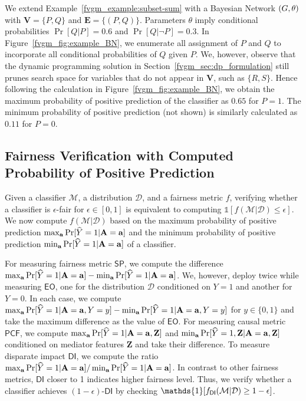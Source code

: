  	 
	\begin{example}
		\normalfont
		We extend Example~\ref{fvgm_example:subset-sum} with a Bayesian Network $ (G, \theta) $ with $ \mathbf{V} = \{P, Q\} $ and $ \mathbf{E} = \{(P,Q)\} $. Parameters $ \theta $ imply conditional probabilities $ \Pr[Q|P] = 0.6 $ and $ \Pr[Q|\neg P] = 0.3 $. 	In Figure~\ref{fvgm_fig:example_BN}, we enumerate all  assignment of $ P $ and $ Q $ to  incorporate all conditional probabilities of $ Q $ given $ P $. We, however, observe that the dynamic programming solution in Section~\ref{fvgm_sec:dp_formulation} still prunes search space for variables that do not appear in $ \mathbf{V} $, such as $ \{R, S\} $. Hence following the calculation in Figure~\ref{fvgm_fig:example_BN}, we obtain the maximum probability of positive prediction of the classifier as $ 0.65 $ for $ P = 1 $. The minimum probability of positive prediction (not shown)  is similarly calculated as $ 0.11 $ for $ P = 0 $. 
	\end{example}


	\subsection{Fairness Verification with Computed Probability of Positive Prediction} 
	Given a classifier $\mathcal{M}$, a  distribution $\mathcal{D}$, and a fairness metric $f$, verifying whether a classifier is $\epsilon$-fair for $\epsilon \in [0,1]$ is equivalent to computing $\mathds{1}[f(\mathcal{M}|\mathcal{D})\leq \epsilon]$. We now compute $f(\mathcal{M}|\mathcal{D})$ based on the maximum probability of positive prediction $ \max_{ \mathbf{a}} \Pr[\widehat{Y} =1 | \mathbf{A} = \mathbf{a}] $ and the  minimum probability of positive prediction $ \min_{ \mathbf{a}} \Pr[\widehat{Y} =1 | \mathbf{A} = \mathbf{a}] $ of a classifier.
	
	For measuring fairness metric $ \mathsf{SP} $, we compute the difference $ \max_{ \mathbf{a}} \Pr[\widehat{Y} =1 | \mathbf{A} = \mathbf{a}]  - \min_{ \mathbf{a}} \Pr[\widehat{Y} =1 | \mathbf{A} = \mathbf{a}] $. We, however, deploy {\fvgm} twice while measuring $ \mathsf{EO} $, one for the distribution $ \mathcal{D} $ conditioned on $ Y = 1  $ and another for $ Y = 0 $. In each case, we compute $ \max_{ \mathbf{a}} \Pr[\widehat{Y} =1 | \mathbf{A} = \mathbf{a}, Y = y ]  - \min_{ \mathbf{a}} \Pr[\widehat{Y} =1 | \mathbf{A} = \mathbf{a}, Y = y ] $ for $ y \in \{0,1\} $ and take the  maximum difference as the value of $ \mathsf{EO} $. For measuring causal metric $ \mathsf{PCF} $, we compute  $ \max_{ \mathbf{a}} \Pr[\widehat{Y} =1 | \mathbf{A} = \mathbf{a}, \mathbf{Z}] $ and  $ \min_{ \mathbf{a}} \Pr[\widehat{Y} =1, \mathbf{Z}| \mathbf{A} = \mathbf{a} , \mathbf{Z}] $ conditioned on mediator features $ \mathbf{Z} $ and take their difference. 	To measure disparate impact $ \mathsf{DI} $, we compute the ratio $ \max_{ \mathbf{a}} \Pr[\widehat{Y} =1 | \mathbf{A} = \mathbf{a}] / \min_{ \mathbf{a}} \Pr[\widehat{Y} =1 | \mathbf{A} = \mathbf{a}] $. In contrast to other fairness metrics, $ \mathsf{DI} $ closer to 1 indicates higher fairness level. Thus, we verify whether a classifier achieves $(1 - \epsilon)$-$ \mathsf{DI} $ by checking $ \mathds{1}[f_{\mathsf{DI}}(\alg| \mathcal{D}) \ge 1 - \epsilon] $.
	
